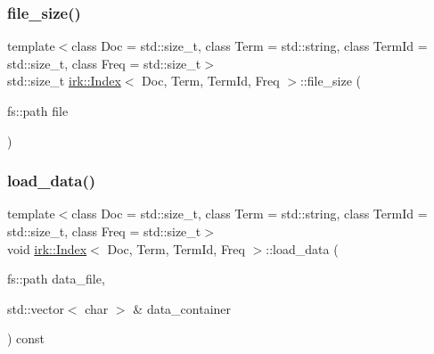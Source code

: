 \mbox{\label{classirk_1_1Index_a514310770dbffbe7df62fd66e2dfb928}} 
\subsubsection{\texorpdfstring{file\+\_\+size()}{file\_size()}}
{\footnotesize\ttfamily template$<$class Doc  = std\+::size\+\_\+t, class Term  = std\+::string, class Term\+Id  = std\+::size\+\_\+t, class Freq  = std\+::size\+\_\+t$>$ \\
std\+::size\+\_\+t \mbox{\hyperlink{classirk_1_1Index}{irk\+::\+Index}}$<$ Doc, Term, Term\+Id, Freq $>$\+::file\+\_\+size (\begin{DoxyParamCaption}\item[{fs\+::path}]{file }\end{DoxyParamCaption})\hspace{0.3cm}{\ttfamily [inline]}}

\mbox{\label{classirk_1_1Index_a71c41b09c956bb2ba3b0c303ce81ec0e}} 
\subsubsection{\texorpdfstring{load\+\_\+data()}{load\_data()}\hspace{0.1cm}{\footnotesize\ttfamily [1/2]}}
{\footnotesize\ttfamily template$<$class Doc  = std\+::size\+\_\+t, class Term  = std\+::string, class Term\+Id  = std\+::size\+\_\+t, class Freq  = std\+::size\+\_\+t$>$ \\
void \mbox{\hyperlink{classirk_1_1Index}{irk\+::\+Index}}$<$ Doc, Term, Term\+Id, Freq $>$\+::load\+\_\+data (\begin{DoxyParamCaption}\item[{fs\+::path}]{data\+\_\+file,  }\item[{std\+::vector$<$ char $>$ \&}]{data\+\_\+container }\end{DoxyParamCaption}) const\hspace{0.3cm}{\ttfamily [inline]}}

\mbox{\label{classirk_1_1Index_afc5fbee8ec5fb126ba8eac0d88baf486}} 
